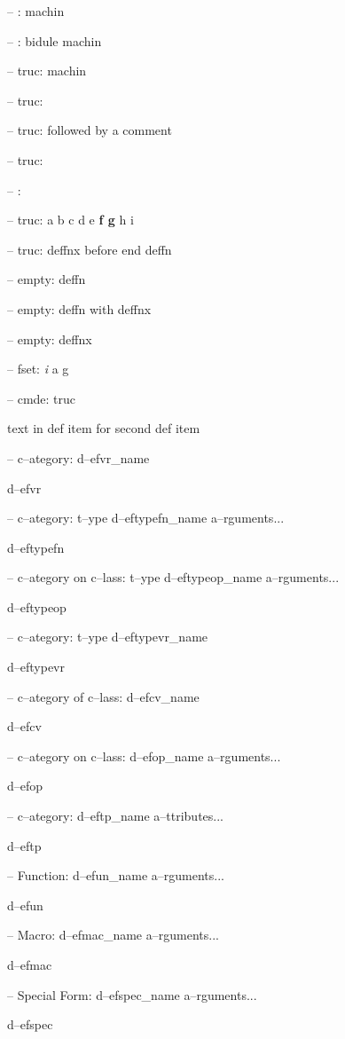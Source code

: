 \documentclass{book}
\begin{document}
\hbox{}-- : machin


\hbox{}-- : bidule machin


\hbox{}-- truc: machin


\hbox{}-- truc: 


\hbox{}-- truc: followed by a comment


\hbox{}-- truc: 


\hbox{}-- : 


\hbox{}-- truc: a b c d e \textbf{f g} h i


\hbox{}-- truc: deffnx before end deffn



\hbox{}-- empty: deffn



\hbox{}-- empty: deffn with deffnx


\hbox{}-- empty: deffnx



\hbox{}-- fset: \emph{i} a g


\hbox{}-- cmde: truc 


text in def item for second def item

\hbox{}-- c--ategory: d--efvr\_name


d--efvr

\hbox{}-- c--ategory: t--ype d--eftypefn\_name a--rguments...


d--eftypefn

\hbox{}-- c--ategory on c--lass: t--ype d--eftypeop\_name a--rguments...


d--eftypeop

\hbox{}-- c--ategory: t--ype d--eftypevr\_name


d--eftypevr

\hbox{}-- c--ategory of c--lass: d--efcv\_name


d--efcv

\hbox{}-- c--ategory on c--lass: d--efop\_name a--rguments...


d--efop

\hbox{}-- c--ategory: d--eftp\_name a--ttributes...


d--eftp

\hbox{}-- Function: d--efun\_name a--rguments...


d--efun

\hbox{}-- Macro: d--efmac\_name a--rguments...


d--efmac

\hbox{}-- Special Form: d--efspec\_name a--rguments...


d--efspec
\end{document}
